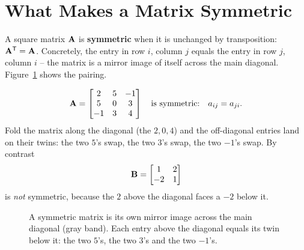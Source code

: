 \section{What Makes a Matrix Symmetric}
\label{ch26:what-is-symmetric}

A square matrix $\mathbf{A}$ is \textbf{symmetric} when it is unchanged by
transposition: $\mathbf{A}^{\mathsf{T}} = \mathbf{A}$. Concretely, the entry in row $i$, column
$j$ equals the entry in row $j$, column $i$ -- the matrix is a mirror image of
itself across the main diagonal.
Figure~\ref{ch26:fig-mirror} shows the pairing.

\[
  \mathbf{A} = \begin{bmatrix} 2 & 5 & -1 \\ 5 & 0 & 3 \\ -1 & 3 & 4 \end{bmatrix}
  \quad\text{is symmetric:}\quad a_{ij}=a_{ji}.
\]
Fold the matrix along the diagonal (the $2,0,4$) and the off-diagonal entries land
on their twins: the two $5$'s swap, the two $3$'s swap, the two $-1$'s swap. By
contrast
\[
  \mathbf{B} = \begin{bmatrix} 1 & 2 \\ -2 & 1 \end{bmatrix}
\]
is \emph{not} symmetric, because the $2$ above the diagonal faces a $-2$ below it.

\begin{figure}[htbp]
\centering
{}
\caption{A symmetric matrix is its own mirror image across the main diagonal
(gray band). Each entry above the diagonal equals its twin below it: the two $5$'s,
the two $3$'s and the two $-1$'s.}
\label{ch26:fig-mirror}
\end{figure}

